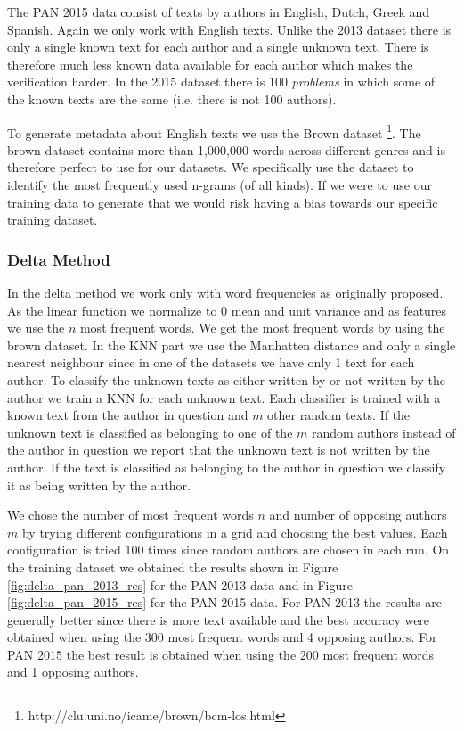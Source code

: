 The PAN 2015 data consist of texts by authors in English, Dutch, Greek and
Spanish. Again we only work with English texts. Unlike the 2013 dataset there is
only a single known text for each author and a single unknown text. There is
therefore much less known data available for each author which makes the
verification harder. In the 2015 dataset there is 100 \textit{problems} in which
some of the known texts are the same (i.e. there is not 100 authors).

To generate metadata about English texts we use the Brown dataset
\footnote{http://clu.uni.no/icame/brown/bcm-los.html}. The brown dataset
contains more than 1,000,000 words across different genres and is therefore
perfect to use for our datasets. We specifically use the dataset to identify
the most frequently used n-grams (of all kinds). If we were to use our training
data to generate that we would risk having a bias towards our specific training
dataset.

\subsubsection{Delta Method}
In the delta method we work only with word frequencies as originally proposed.
As the linear function we normalize to 0 mean and unit variance and as features
we use the $n$ most frequent words. We get the most frequent words by using the
brown dataset. In the \gls{KNN} part we use the Manhatten distance and only a
single nearest neighbour since in one of the datasets we have only 1 text for
each author. To classify the unknown texts as either written by or not written
by the author we train a \gls{KNN} for each unknown text. Each classifier is
trained with a known text from the author in question and $m$ other random
texts. If the unknown text is classified as belonging to one of the $m$ random
authors instead of the author in question we report that the unknown text is not
written by the author. If the text is classified as belonging to the author in
question we classify it as being written by the author.

We chose the number of most frequent words $n$ and number of opposing
authors $m$ by trying different configurations in a grid and choosing the
best values. Each configuration is tried 100 times since random authors are
chosen in each run. On the training dataset we obtained the results shown in
Figure \ref{fig:delta_pan_2013_res} for the PAN 2013 data and in Figure
\ref{fig:delta_pan_2015_res} for the PAN 2015 data. For PAN 2013 the results are
generally better since there is more text available and the best accuracy were
obtained when using the 300 most frequent words and 4 opposing authors. For PAN
2015 the best result is obtained when using the 200 most frequent words and 1
opposing authors.

